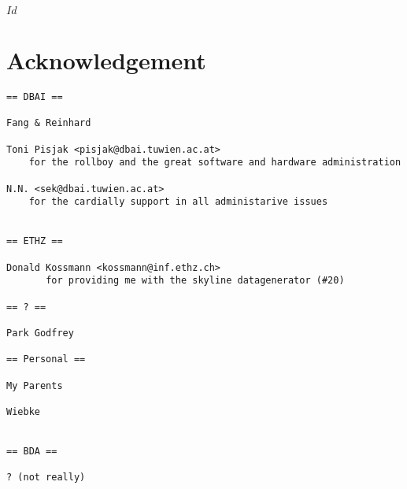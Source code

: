 
\svnInfo $Id$

\chapter*{Acknowledgement\revision}

\begin{verbatim}
== DBAI ==

Fang & Reinhard

Toni Pisjak <pisjak@dbai.tuwien.ac.at>
	for the rollboy and the great software and hardware administration

N.N. <sek@dbai.tuwien.ac.at>
	for the cardially support in all administarive issues


== ETHZ ==

Donald Kossmann <kossmann@inf.ethz.ch> 
       for providing me with the skyline datagenerator (#20)

== ? ==

Park Godfrey

== Personal ==

My Parents

Wiebke


== BDA ==

? (not really)
\end{verbatim}
